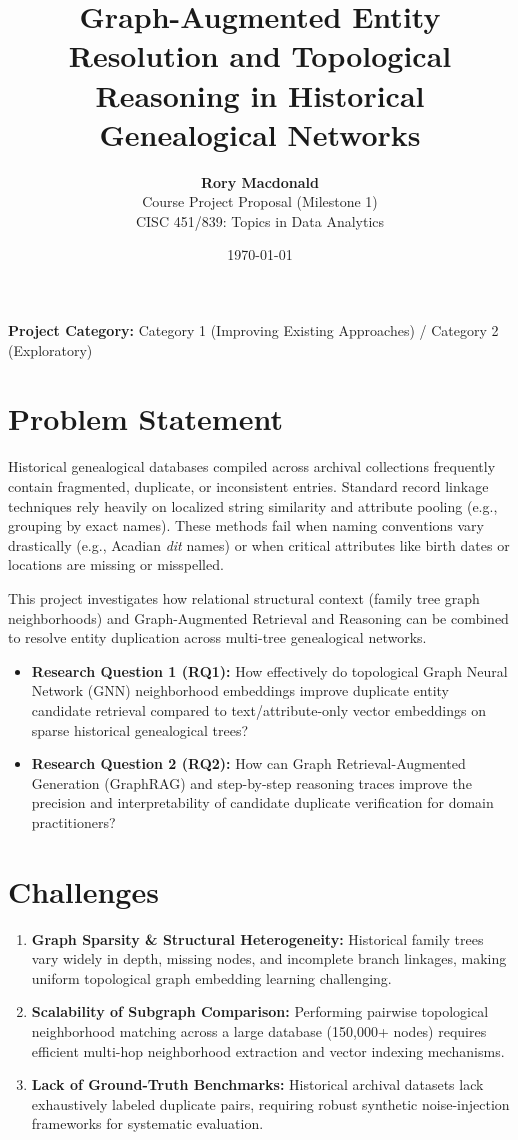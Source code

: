 \documentclass[11pt, a4paper]{article}
\title{\textbf{Graph-Augmented Entity Resolution and Topological Reasoning in Historical Genealogical Networks}}
\author{\textbf{Rory Macdonald} \\ Course Project Proposal (Milestone 1) \\ CISC 451/839: Topics in Data Analytics}
\date{\today}
\begin{document}
\maketitle

\noindent\textbf{Project Category:} Category 1 (Improving Existing Approaches) / Category 2 (Exploratory)

\vspace{0.8em}

\section{Problem Statement}
Historical genealogical databases compiled across archival collections frequently contain fragmented, duplicate, or inconsistent entries. Standard record linkage techniques rely heavily on localized string similarity and attribute pooling (e.g., grouping by exact names). These methods fail when naming conventions vary drastically (e.g., Acadian \textit{dit} names) or when critical attributes like birth dates or locations are missing or misspelled. 

This project investigates how relational structural context (family tree graph neighborhoods) and Graph-Augmented Retrieval and Reasoning can be combined to resolve entity duplication across multi-tree genealogical networks.

\begin{itemize}
    \item \textbf{Research Question 1 (RQ1):} How effectively do topological Graph Neural Network (GNN) neighborhood embeddings improve duplicate entity candidate retrieval compared to text/attribute-only vector embeddings on sparse historical genealogical trees?
    \item \textbf{Research Question 2 (RQ2):} How can Graph Retrieval-Augmented Generation (GraphRAG) and step-by-step reasoning traces improve the precision and interpretability of candidate duplicate verification for domain practitioners?
\end{itemize}

\section{Challenges}
\begin{enumerate}
    \item \textbf{Graph Sparsity \& Structural Heterogeneity:} Historical family trees vary widely in depth, missing nodes, and incomplete branch linkages, making uniform topological graph embedding learning challenging.
    \item \textbf{Scalability of Subgraph Comparison:} Performing pairwise topological neighborhood matching across a large database (150,000+ nodes) requires efficient multi-hop neighborhood extraction and vector indexing mechanisms.
    \item \textbf{Lack of Ground-Truth Benchmarks:} Historical archival datasets lack exhaustively labeled duplicate pairs, requiring robust synthetic noise-injection frameworks for systematic evaluation.
\end{enumerate}
\end{document}
